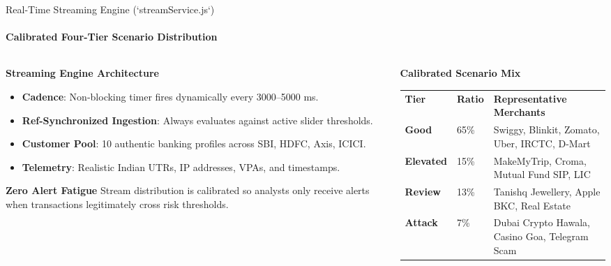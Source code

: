 \documentclass[aspectratio=169,10pt]{beamer}
\begin{document}
\begin{frame}{Real-Time Streaming Engine (`streamService.js`)}
  \framesubtitle{Calibrated Four-Tier Scenario Distribution}
  \begin{columns}[t]
    \begin{column}{0.50\textwidth}
      \begin{block}{\textbf{Streaming Engine Architecture}}
        \begin{itemize}
          \item \textbf{Cadence}: Non-blocking timer fires dynamically every 3000--5000 ms.
          \item \textbf{Ref-Synchronized Ingestion}: Always evaluates against active slider thresholds.
          \item \textbf{Customer Pool}: 10 authentic banking profiles across SBI, HDFC, Axis, ICICI.
          \item \textbf{Telemetry}: Realistic Indian UTRs, IP addresses, VPAs, and timestamps.
        \end{itemize}
      \end{block}
      \vspace{0.2em}
      \begin{alertblock}{\textbf{Zero Alert Fatigue}}
        \footnotesize Stream distribution is calibrated so analysts only receive alerts when transactions legitimately cross risk thresholds.
      \end{alertblock}
    \end{column}

    \begin{column}{0.48\textwidth}
      \begin{exampleblock}{\textbf{Calibrated Scenario Mix}}
        \scriptsize
        \begin{tabular}{llp{3.0cm}}
          \toprule
          \textbf{Tier} & \textbf{Ratio} & \textbf{Representative Merchants} \\
          \par\vspace{0.2em}\dotfill\par

          \textbf{\textcolor{statusGreen}{Good}} & 65\% & Swiggy, Blinkit, Zomato, Uber, IRCTC, D-Mart \\
          \textbf{\textcolor{primaryBlue}{Elevated}} & 15\% & MakeMyTrip, Croma, Mutual Fund SIP, LIC \\
          \textbf{\textcolor{statusYellow}{Review}} & 13\% & Tanishq Jewellery, Apple BKC, Real Estate \\
          \textbf{\textcolor{statusRed}{Attack}} & 7\% & Dubai Crypto Hawala, Casino Goa, Telegram Scam \\
          \bottomrule
        \end{tabular}
      \end{exampleblock}
    \end{column}
  \end{columns}
\end{frame}
\end{document}
